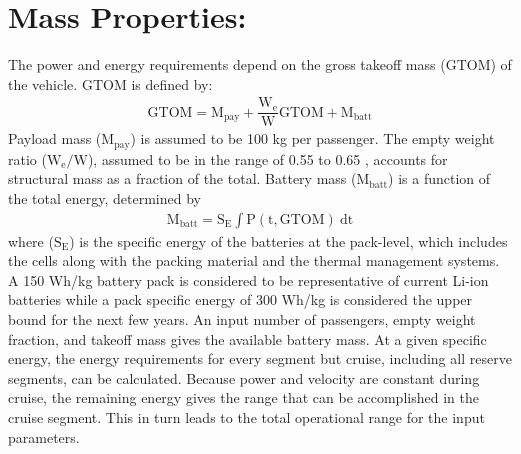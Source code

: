 \documentclass{achemso}
\begin{document}
\section*{Mass Properties:}
\vspace{-0.5cm}
The power and energy requirements depend on the gross takeoff mass ($\mathrm{GTOM}$) of the vehicle. $\mathrm{GTOM}$ is defined by: 
\begin{gather*}
\mathrm{GTOM = M_{pay} + \dfrac{W_e}{W} GTOM + M_{batt}}
\end{gather*}
Payload mass ($\mathrm{M_{pay}}$) is assumed to be 100 kg per passenger. The empty weight ratio ($\mathrm{{W_e}/{W}}$), assumed to be in the range of 0.55 \cite{mit2018vtolOptim} to 0.65 \cite{uber2017air}, accounts for structural mass as a fraction of the total. Battery mass ($\mathrm{M_{batt}}$) is a function of the total energy, determined by 
\begin{gather*}
\mathrm{M_{batt} = S_E \int P(t, GTOM) \ dt}
\end{gather*}
where ($\mathrm{S_E}$) is the specific energy of the batteries at the pack-level, which includes the cells along with the packing material and the thermal management systems. A 150 Wh/kg battery pack is considered to be representative of current Li-ion batteries\cite{epa2018model3} while a pack specific energy of 300 Wh/kg is considered the upper bound for the next few years. An input number of passengers, empty weight fraction, and takeoff mass gives the available battery mass. At a given specific energy, the energy requirements for every segment but cruise, including all reserve segments, can be calculated. Because power and velocity are constant during cruise, the remaining energy gives the range that can be accomplished in the cruise segment. This in turn leads to the total operational range for the input parameters. 
\vspace{-0.5cm}
\end{document}
